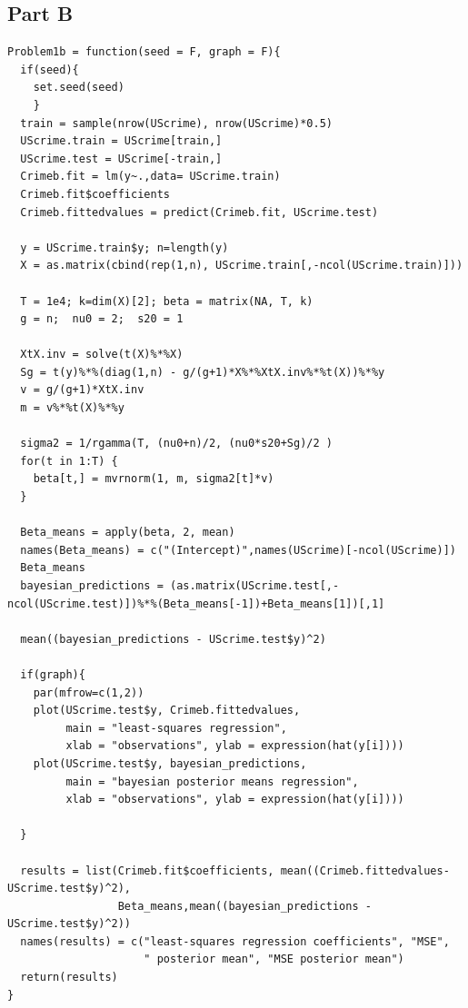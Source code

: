 \documentclass{article}\usepackage[]{graphicx}\usepackage[]{color}
\makeatletter
\newenvironment{kframe}{%
 \def\at@end@of@kframe{}%
 \ifinner\ifhmode%
  \def\at@end@of@kframe{\end{minipage}}%
  \begin{minipage}{\columnwidth}%
 \fi\fi%
 \def\FrameCommand##1{\hskip\@totalleftmargin \hskip-\fboxsep
 \colorbox{shadecolor}{##1}\hskip-\fboxsep
     \hskip-\linewidth \hskip-\@totalleftmargin \hskip\columnwidth}%
 \MakeFramed {\advance\hsize-\width
   \@totalleftmargin\z@ \linewidth\hsize
   \@setminipage}}%
 {\par\unskip\endMakeFramed%
 \at@end@of@kframe}
\newenvironment{knitrout}{}{} %
\makeatother
\begin{document}
\subsection*{Part B}
\begin{knitrout}
\color{fgcolor}\begin{kframe}
\begin{verbatim}
Problem1b = function(seed = F, graph = F){
  if(seed){
    set.seed(seed)
    }
  train = sample(nrow(UScrime), nrow(UScrime)*0.5)
  UScrime.train = UScrime[train,]
  UScrime.test = UScrime[-train,]
  Crimeb.fit = lm(y~.,data= UScrime.train)
  Crimeb.fit$coefficients
  Crimeb.fittedvalues = predict(Crimeb.fit, UScrime.test)

  y = UScrime.train$y; n=length(y)
  X = as.matrix(cbind(rep(1,n), UScrime.train[,-ncol(UScrime.train)]))

  T = 1e4; k=dim(X)[2]; beta = matrix(NA, T, k)
  g = n;  nu0 = 2;  s20 = 1

  XtX.inv = solve(t(X)%*%X)
  Sg = t(y)%*%(diag(1,n) - g/(g+1)*X%*%XtX.inv%*%t(X))%*%y
  v = g/(g+1)*XtX.inv
  m = v%*%t(X)%*%y

  sigma2 = 1/rgamma(T, (nu0+n)/2, (nu0*s20+Sg)/2 )
  for(t in 1:T) {
    beta[t,] = mvrnorm(1, m, sigma2[t]*v)
  }

  Beta_means = apply(beta, 2, mean)
  names(Beta_means) = c("(Intercept)",names(UScrime)[-ncol(UScrime)])
  Beta_means
  bayesian_predictions = (as.matrix(UScrime.test[,-ncol(UScrime.test)])%*%(Beta_means[-1])+Beta_means[1])[,1]
  
  mean((bayesian_predictions - UScrime.test$y)^2)
  
  if(graph){
    par(mfrow=c(1,2))
    plot(UScrime.test$y, Crimeb.fittedvalues, 
         main = "least-squares regression", 
         xlab = "observations", ylab = expression(hat(y[i])))
    plot(UScrime.test$y, bayesian_predictions, 
         main = "bayesian posterior means regression", 
         xlab = "observations", ylab = expression(hat(y[i])))
    
  }
  
  results = list(Crimeb.fit$coefficients, mean((Crimeb.fittedvalues-UScrime.test$y)^2),
                 Beta_means,mean((bayesian_predictions - UScrime.test$y)^2))
  names(results) = c("least-squares regression coefficients", "MSE", 
                     " posterior mean", "MSE posterior mean")
  return(results)
}


\end{verbatim}
\end{kframe}
\end{knitrout}
\end{document}
